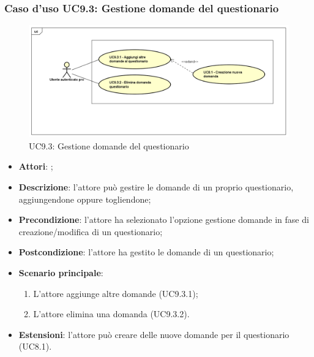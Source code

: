 	 \subsubsection{Caso d'uso UC9.3: Gestione domande del questionario}
	 \label{UC9.3}
	 \begin{figure}[h]
	 	\centering
	 	\includegraphics[scale=0.45,keepaspectratio]{UML/UC9_3.png}
	 	\caption{UC9.3: Gestione domande del questionario}
	 \end{figure}
	 \FloatBarrier
	 \begin{itemize}
	 	\item \textbf{Attori}: \uaupro{};
	 	\item \textbf{Descrizione}: l'attore può gestire le domande di un proprio questionario, aggiungendone oppure togliendone;
	 	\item \textbf{Precondizione}: l'attore ha selezionato l'opzione gestione domande in fase di \\creazione/modifica di un questionario;
	 	\item \textbf{Postcondizione}: l'attore ha gestito le domande di un questionario;
	 	\item \textbf{Scenario principale}: 
	 	\begin{enumerate}
	 		\item L'attore aggiunge altre domande (UC9.3.1);
	 		\item L'attore elimina una domanda (UC9.3.2).
	 	\end{enumerate}
	 	\item \textbf{Estensioni}: l'attore può creare delle nuove domande per il questionario (UC8.1).		
	 \end{itemize}
	 
